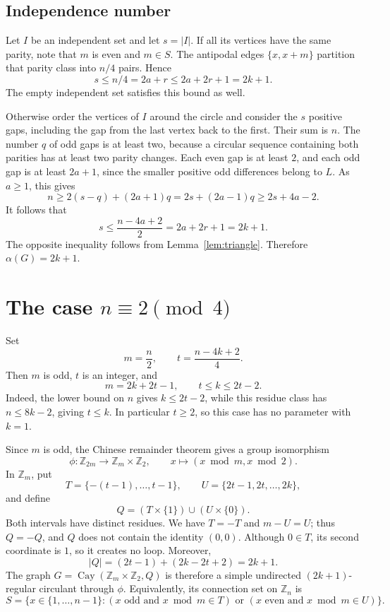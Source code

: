 \documentclass[11pt]{article}
\newcommand{\Z}{\mathbb Z}
\newcommand{\Cay}{\operatorname{Cay}}
\begin{document}
\subsection*{Independence number}

Let \(I\) be an independent set and let \(s=|I|\).
If all its vertices have the same parity, note that \(m\) is even and
\(m\in S\). The antipodal edges \(\{x,x+m\}\) partition that parity class
into \(n/4\) pairs. Hence
\[
s\le n/4=2a+r\le2a+2r+1=2k+1.
\]
The empty independent set satisfies this bound as well.

Otherwise order the vertices of \(I\) around the circle and consider the
\(s\) positive gaps, including the gap from the last vertex back to the
first. Their sum is \(n\). The number \(q\) of odd gaps is at least two,
because a circular sequence containing both parities has at least two
parity changes. Each even gap is at least \(2\), and each odd gap is at
least \(2a+1\), since the smaller positive odd differences belong to \(L\).
As \(a\ge1\), this gives
\[
n\ge2(s-q)+(2a+1)q
 =2s+(2a-1)q\ge2s+4a-2.
\]
It follows that
\[
s\le\frac{n-4a+2}{2}=2a+2r+1=2k+1.
\]
The opposite inequality follows from Lemma~\ref{lem:triangle}.
Therefore \(\alpha(G)=2k+1\).

\section{\texorpdfstring{The case \(n\equiv2\pmod4\)}{The case n congruent to 2 modulo 4}}

Set
\[
m=\frac n2,\qquad t=\frac{n-4k+2}{4}.
\]
Then \(m\) is odd, \(t\) is an integer, and
\[
m=2k+2t-1,\qquad t\le k\le2t-2.
\tag{4}\label{eq:secondparameters}
\]
Indeed, the lower bound on \(n\) gives \(k\le2t-2\), while this residue
class has \(n\le8k-2\), giving \(t\le k\).
In particular \(t\ge2\), so this case has no parameter with \(k=1\).

Since \(m\) is odd, the Chinese remainder theorem gives a group isomorphism
\[
\phi:\Z_{2m}\longrightarrow\Z_m\times\Z_2,\qquad
x\longmapsto(x\bmod m,x\bmod2).
\]
In \(\Z_m\), put
\[
T=\{-(t-1),\ldots,t-1\},\qquad U=\{2t-1,2t,\ldots,2k\},
\]
and define
\[
Q=(T\times\{1\})\cup(U\times\{0\}).
\tag{5}\label{eq:secondset}
\]
Both intervals have distinct residues. We have \(T=-T\) and \(m-U=U\);
thus \(Q=-Q\), and \(Q\) does not contain the identity \((0,0)\).
Although \(0\in T\), its second coordinate is \(1\), so it creates no loop.
Moreover,
\[
|Q|=(2t-1)+(2k-2t+2)=2k+1.
\]
The graph \(G=\Cay(\Z_m\times\Z_2,Q)\) is therefore a simple undirected
\((2k+1)\)-regular circulant through \(\phi\).
Equivalently, its connection set on \(\Z_n\) is
\[
S=\{x\in\{1,\ldots,n-1\}:
 (x\text{ odd and }x\bmod m\in T)
 \text{ or }(x\text{ even and }x\bmod m\in U)\}.
\tag{6}\label{eq:directcrt}
\]
\end{document}
